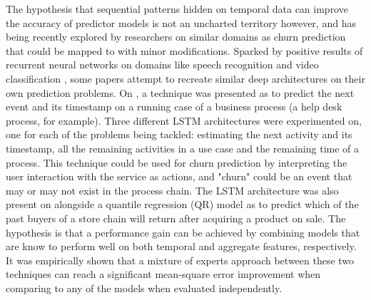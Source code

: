 \documentclass{kththesis}
\begin{document}
The hypothesis that sequential patterns hidden on temporal data can improve the accuracy of predictor models is not an uncharted territory however, and has being recently explored by researchers on similar domains as churn prediction that could be mapped to with minor modifications. Sparked by positive results of recurrent neural networks on domains like speech recognition \citep{graves2013speech} and video classification \citep{yue2015beyond}, some papers attempt to recreate similar deep architectures on their own prediction problems. On \citep{Tax2016}, a technique was presented as to predict the next event and its timestamp on a running case of a business process (a help desk process, for example). Three different LSTM architectures were experimented on, one for each of the problems being tackled: estimating the next activity and its timestamp, all the remaining activities in a use case and the remaining time of a process. This technique could be used for churn prediction by interpreting the user interaction with the service as actions, and "churn" could be an event that may or may not exist in the process chain. The LSTM architecture was also present on \citep{Auon2015} alongside a quantile regression (QR) model as to predict which of the past buyers of a store chain will return after acquiring a product on sale. The hypothesis is that a performance gain can be achieved by combining models that are know to perform well on both temporal and aggregate features, respectively. It was empirically shown that a mixture of experts approach between these two techniques can reach a significant mean-square error improvement when comparing to any of the models when evaluated independently. 
\end{document}

